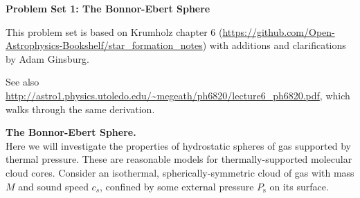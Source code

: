 \documentclass[twoside]{tufte-book} %
\begin{document}
\noindent\textbf{Problem Set 1: The Bonnor-Ebert Sphere}

This problem set is based on Krumholz chapter 6
(\url{https://github.com/Open-Astrophysics-Bookshelf/star_formation_notes})
with additions and clarifications by Adam Ginsburg.

See also
\url{http://astro1.physics.utoledo.edu/~megeath/ph6820/lecture6_ph6820.pdf},
which walks through the same derivation.

\textbf{The Bonnor-Ebert Sphere.}\\
Here we will investigate the properties of hydrostatic spheres of gas supported
by thermal pressure. These are reasonable models for thermally-supported
molecular cloud cores. Consider an isothermal, spherically-symmetric cloud of
gas with mass $M$ and sound speed $c_s$, confined by some external pressure
$P_{\mathrm{s}}$ on its surface.
\end{document}
